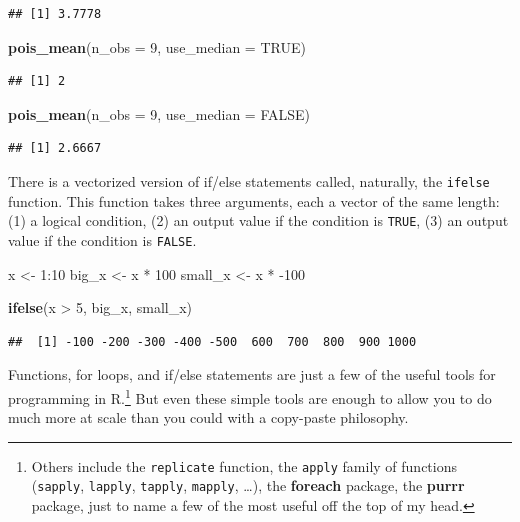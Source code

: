 \documentclass[12pt,oneside,openany]{book}
\newenvironment{Shaded}{\begin{snugshade}}{\end{snugshade}}
\newcommand{\KeywordTok}[1]{\textcolor[rgb]{0.13,0.29,0.53}{\textbf{{#1}}}}
\newcommand{\DataTypeTok}[1]{\textcolor[rgb]{0.13,0.29,0.53}{{#1}}}
\newcommand{\DecValTok}[1]{\textcolor[rgb]{0.00,0.00,0.81}{{#1}}}
\newcommand{\StringTok}[1]{\textcolor[rgb]{0.31,0.60,0.02}{{#1}}}
\newcommand{\OtherTok}[1]{\textcolor[rgb]{0.56,0.35,0.01}{{#1}}}
\newcommand{\NormalTok}[1]{{#1}}
\let\rmarkdownfootnote\footnote%
\def\footnote{\protect\rmarkdownfootnote}
\begin{document}
\begin{verbatim}
## [1] 3.7778
\end{verbatim}

\begin{Shaded}
\begin{Highlighting}[]
\KeywordTok{pois_mean}\NormalTok{(}\DataTypeTok{n_obs =} \DecValTok{9}\NormalTok{, }\DataTypeTok{use_median =} \OtherTok{TRUE}\NormalTok{)}
\end{Highlighting}
\end{Shaded}

\begin{verbatim}
## [1] 2
\end{verbatim}

\begin{Shaded}
\begin{Highlighting}[]
\KeywordTok{pois_mean}\NormalTok{(}\DataTypeTok{n_obs =} \DecValTok{9}\NormalTok{, }\DataTypeTok{use_median =} \OtherTok{FALSE}\NormalTok{)}
\end{Highlighting}
\end{Shaded}

\begin{verbatim}
## [1] 2.6667
\end{verbatim}

There is a vectorized version of if/else statements called, naturally,
the \texttt{ifelse} function. This function takes three arguments, each
a vector of the same length: (1) a logical condition, (2) an output
value if the condition is \texttt{TRUE}, (3) an output value if the
condition is \texttt{FALSE}.

\begin{Shaded}
\begin{Highlighting}[]
\NormalTok{x <-}\StringTok{ }\DecValTok{1}\NormalTok{:}\DecValTok{10}
\NormalTok{big_x <-}\StringTok{ }\NormalTok{x *}\StringTok{ }\DecValTok{100}
\NormalTok{small_x <-}\StringTok{ }\NormalTok{x *}\StringTok{ }\NormalTok{-}\DecValTok{100}

\KeywordTok{ifelse}\NormalTok{(x >}\StringTok{ }\DecValTok{5}\NormalTok{, big_x, small_x)}
\end{Highlighting}
\end{Shaded}

\begin{verbatim}
##  [1] -100 -200 -300 -400 -500  600  700  800  900 1000
\end{verbatim}

Functions, for loops, and if/else statements are just a few of the
useful tools for programming in R.\footnote{Others include the
  \texttt{replicate} function, the \texttt{apply} family of functions
  (\texttt{sapply}, \texttt{lapply}, \texttt{tapply}, \texttt{mapply},
  \ldots{}), the \textbf{foreach} package, the \textbf{purrr} package,
  just to name a few of the most useful off the top of my head.} But
even these simple tools are enough to allow you to do much more at scale
than you could with a copy-paste philosophy.
\end{document}
